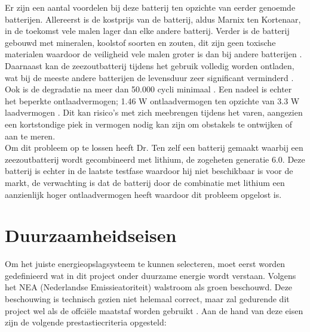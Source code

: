 \noindent Er zijn een aantal voordelen bij deze batterij ten opzichte van eerder genoemde batterijen. Allereerst is de kostprijs van de batterij, aldus Marnix ten Kortenaar, in de toekomst vele malen lager dan elke andere batterij. Verder is de batterij gebouwd met mineralen, koolstof soorten en zouten, dit zijn geen toxische materialen waardoor de veiligheid vele malen groter is dan bij andere batterijen \cite{DrTen1}. Daarnaast kan de zeezoutbatterij tijdens het gebruik volledig worden ontladen, wat bij de meeste andere batterijen de levensduur zeer significant verminderd \cite{DrTen1}. Ook is de degradatie na meer dan 50.000 cycli minimaal \cite{JIPBatteryMaassluis} \label{zeezout50000}. Een nadeel is echter het beperkte ontlaadvermogen; 1.46 W ontlaadvermogen ten opzichte van 3.3 W laadvermogen \cite{JIPBatteryMaassluis}. Dit kan risico's met zich meebrengen tijdens het varen, aangezien een kortstondige piek in vermogen nodig kan zijn om obstakels te ontwijken of aan te meren. \\

\noindent Om dit probleem op te lossen heeft Dr. Ten zelf een batterij gemaakt waarbij een zeezoutbatterij wordt gecombineerd met lithium, de zogeheten generatie  6.0. Deze batterij is echter in de laatste testfase waardoor hij niet beschikbaar is voor de markt, de verwachting is dat de batterij door de combinatie met lithium een aanzienlijk hoger ontlaadvermogen heeft waardoor dit probleem opgelost is.

\section{Duurzaamheidseisen}
Om het juiste energieopslagsysteem te kunnen selecteren, moet eerst worden gedefinieerd wat in dit project onder duurzame energie wordt verstaan. Volgens het NEA (Nederlandse Emissieatoriteit) \cite{NEAHernieuwbareEnergie} walstroom als groen beschouwd. Deze beschouwing is technisch gezien niet helemaal correct, maar zal gedurende dit project wel als de offciële maatstaf worden gebruikt \label{walstroomgroen}. Aan de hand van deze eisen zijn de volgende prestastiecriteria opgesteld:


